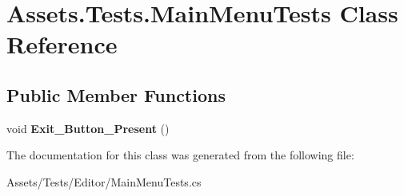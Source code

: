 \hypertarget{classAssets_1_1Tests_1_1MainMenuTests}{}\section{Assets.\+Tests.\+Main\+Menu\+Tests Class Reference}
\label{classAssets_1_1Tests_1_1MainMenuTests}
\subsection*{Public Member Functions}
\begin{DoxyCompactItemize}
\item 
void {\bfseries Exit\+\_\+\+Button\+\_\+\+Present} ()\hypertarget{classAssets_1_1Tests_1_1MainMenuTests_a1647691ccfeb8df0267b193561510f85}{}\label{classAssets_1_1Tests_1_1MainMenuTests_a1647691ccfeb8df0267b193561510f85}

\end{DoxyCompactItemize}


The documentation for this class was generated from the following file\+:\begin{DoxyCompactItemize}
\item 
Assets/\+Tests/\+Editor/Main\+Menu\+Tests.\+cs\end{DoxyCompactItemize}
